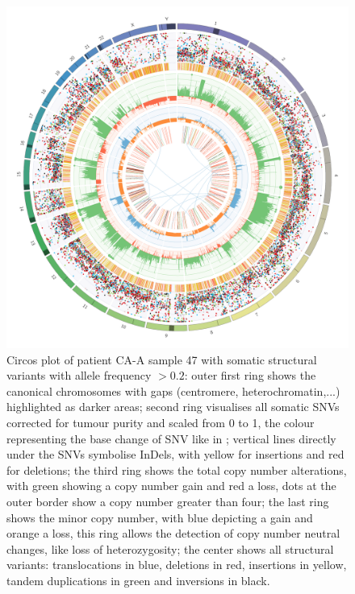\begin{figure}[!ht]
\centering
\includegraphics[width=.99\linewidth]{Figures/CASCADE/CA99/CA99-47.circos.png}
\caption[Circos plot of patient CA-A sample 47]{Circos plot of patient CA-A sample 47 with somatic structural variants with allele frequency $> 0.2$: outer first ring shows the canonical chromosomes with gaps (centromere, heterochromatin,...) highlighted as darker areas; second ring visualises all somatic SNVs corrected for tumour purity and scaled from 0 to 1, the colour representing the base change of SNV like in \protect\textcite{Alexandrov2013}; vertical lines directly under the SNVs symbolise InDels, with yellow for insertions and red for deletions; the third ring shows the total copy number alterations, with green showing a copy number gain and red a loss, dots at the outer border show a copy number greater than four; the last ring shows the minor copy number, with blue depicting a gain and orange a loss, this ring allows the detection of copy number neutral changes, like loss of heterozygosity; the center shows all structural variants: translocations in blue, deletions in red, insertions in yellow, tandem duplications in green and inversions in black.} \label{fig:ca99.47circos}
\end{figure}



